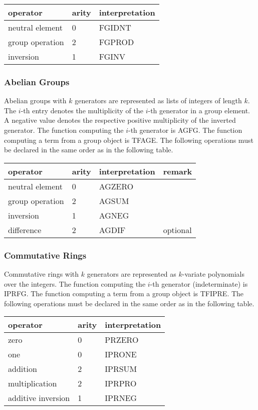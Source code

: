 \begin{center}
\begin{tabular}{l|l|l}
\hline
operator & arity & interpretation \\
\hline
neutral element & 0 & FGIDNT \\
group operation & 2 & FGPROD \\
inversion & 1 & FGINV\\
\hline
\end{tabular}
\end{center}

\subsubsection{Abelian Groups}

Abelian groups with $k$ generators are represented as lists of integers
of length $k$.
The $i$-th entry denotes the multiplicity of the $i$-th generator in a
group element.
A negative value denotes the respective positive multiplicity of the 
inverted generator.
The function computing the $i$-th generator is AGFG. 
The function computing a term from a group object is TFAGE.
The following operations must be declared in the same order as in the
following table.

\begin{center}
\begin{tabular}{l|l|l|l}
\hline
operator & arity & interpretation & remark \\
\hline
neutral element & 0 & AGZERO \\
group operation & 2 & AGSUM \\
inversion & 1 & AGNEG\\
difference & 2 & AGDIF & optional \\
\hline
\end{tabular}
\end{center}

\subsubsection{Commutative Rings}

Commutative rings with $k$ generators are represented as $k$-variate
polynomials over the integers.
The function computing the $i$-th generator (indeterminate) is IPRFG. 
The function computing a term from a group object is TFIPRE.
The following operations must be declared in the same order as in the
following table.

\begin{center}
\begin{tabular}{l|l|l}
\hline
operator & arity & interpretation \\
\hline
zero & 0 & PRZERO \\
one & 0 & IPRONE \\
addition & 2 & IPRSUM \\
multiplication & 2 & IPRPRO \\
additive inversion & 1 & IPRNEG \\
\hline
\end{tabular}
\end{center}

